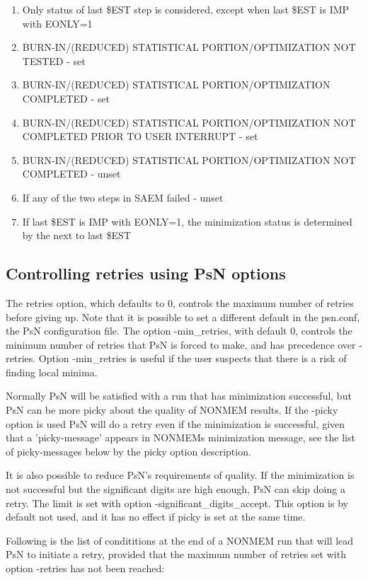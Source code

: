 \documentclass[a4paper,12pt]{article}
\begin{document}
\begin{enumerate}
\item Only status of last \$EST step is considered, except when last \$EST is IMP with EONLY=1
\item BURN-IN/(REDUCED) STATISTICAL PORTION/OPTIMIZATION NOT TESTED - set
\item BURN-IN/(REDUCED) STATISTICAL PORTION/OPTIMIZATION COMPLETED -  set
\item BURN-IN/(REDUCED) STATISTICAL PORTION/OPTIMIZATION NOT COMPLETED PRIOR TO USER INTERRUPT - set
\item BURN-IN/(REDUCED) STATISTICAL PORTION/OPTIMIZATION NOT COMPLETED - unset
\item If any of the two steps in SAEM failed - unset 
\item If last \$EST is IMP with EONLY=1, the minimization status is determined by the next to last \$EST
\end{enumerate}

\subsection{Controlling retries using PsN options}
The retries option, which defaults to 0, controls the maximum number of retries before giving up. Note that it is possible to set a different default in the psn.conf, the PsN configuration file. The option -min\_retries, with default 0, controls the minimum number of retries that PsN is forced to make, and has precedence over -retries. Option -min\_retries is useful if the user suspects that there is a risk of finding local minima.

Normally PsN will be satisfied with a run that has minimization successful, but PsN can be more picky about the quality of NONMEM results. If the -picky option is used PsN will do a retry even if the minimization is successful, given that a 'picky-message' appears in NONMEMs minimization message, see the list of picky-messages below by the picky option description.

It is also possible to reduce PsN's requirements of quality. If the minimization is not successful but the significant digits are high enough, PsN can skip doing a retry. The limit is set with option -significant\_digits\_accept. This option is by default not used, and it has no effect if picky is set at the same time.

Following is the list of condititions at the end of a NONMEM run that will lead PsN to initiate a retry, provided that the maximum number of retries set with option -retries has not been reached:
\end{document}
